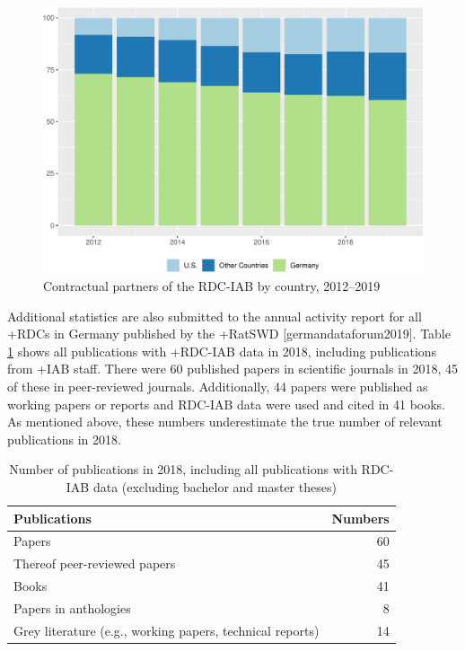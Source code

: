 \documentclass[
]{WileySix}
\begin{document}
\begin{figure}
\centering
\includegraphics{figures/iabfig3-1.pdf}
\caption{\label{fig:iabfig3}Contractual partners of the RDC-IAB by country, 2012--2019}
\end{figure}

Additional statistics are also submitted to the annual activity report for all +RDC\textbar s in Germany published by the +RatSWD\textbar{} {[}germandataforum2019{]}. Table \ref{tab:iabtable2} shows all publications with +RDC-IAB\textbar{} data in 2018, including publications from +IAB\textbar{} staff. There were 60 published papers in scientific journals in 2018, 45 of these in peer-reviewed journals. Additionally, 44 papers were published as working papers or reports and RDC-IAB data were used and cited in 41 books. As mentioned above, these numbers underestimate the true number of relevant publications in 2018.

\begin{table}

\caption{\label{tab:iabtable2}Number of publications in 2018, including all publications with RDC-IAB data (excluding bachelor and master theses)}
\centering
\begin{tabular}[t]{lr}
\toprule
Publications & Numbers\\
\midrule
Papers & 60\\
Thereof peer-reviewed papers & 45\\
Books & 41\\
Papers in anthologies & 8\\
Grey literature (e.g., working papers, technical reports) & 14\\
\bottomrule
\end{tabular}
\end{table}
\end{document}
